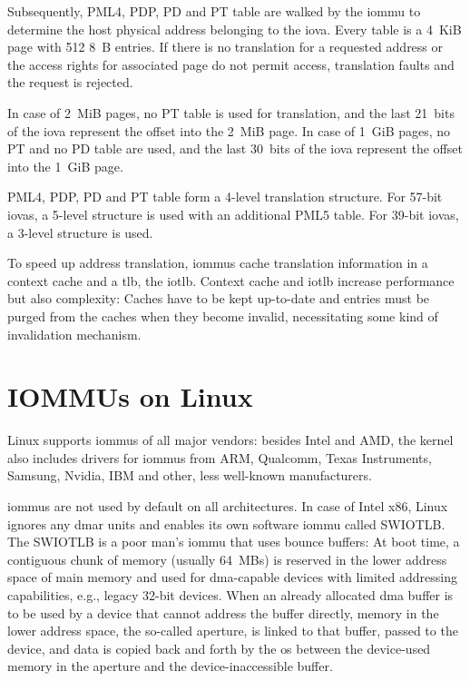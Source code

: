 Subsequently, PML4, PDP, PD and PT table are walked by the \ac{iommu} to
determine the host physical address belonging to the \ac{iova}. Every
table is a 4~KiB page with 512 8~B entries. If there is no translation for a
requested address or the access rights for associated page do not permit access,
translation faults and the request is rejected.

In case of 2~MiB pages, no PT table is used for translation, and the last
21~bits of the \ac{iova} represent the offset into the 2~MiB page. In case of
1~GiB pages, no PT and no PD table are used, and the last 30~bits of the
\ac{iova} represent the offset into the 1~GiB page.

PML4, PDP, PD and PT table form a 4-level translation structure. For 57-bit
\acp{iova}, a 5-level structure is used with an additional PML5 table. For
39-bit \acp{iova}, a 3-level structure is used.

To speed up address translation, \acp{iommu} cache translation information in a
context cache and a \ac{tlb}, the \ac{iotlb}. Context cache and \ac{iotlb}
increase performance but also complexity: Caches have to be kept up-to-date and
entries must be purged from the caches when they become invalid, necessitating
some kind of invalidation mechanism.


\section{IOMMUs on Linux}
\label{sec:iommus_on_linux}

Linux supports \acp{iommu} of all major vendors: besides Intel and AMD, the
kernel also includes drivers for \acp{iommu} from ARM, Qualcomm, Texas
Instruments, Samsung, Nvidia, IBM and other, less well-known manufacturers.

\acp{iommu} are not used by default on all architectures. In case of Intel x86,
Linux ignores any \ac{dmar} units and enables its own software \ac{iommu} called
SWIOTLB. The SWIOTLB is a poor man's \ac{iommu} that uses bounce buffers: At
boot time, a contiguous chunk of memory (usually 64~MBs) is reserved in the
lower address space of main memory and used for \ac{dma}-capable devices with
limited addressing capabilities, e.g., legacy 32-bit devices. When an already
allocated \ac{dma} buffer is to be used by a device that cannot address the
buffer directly, memory in the lower address space, the so-called aperture, is
linked to that buffer, passed to the device, and data is copied back and forth
by the \ac{os} between the device-used memory in the aperture and the
device-inaccessible buffer.

